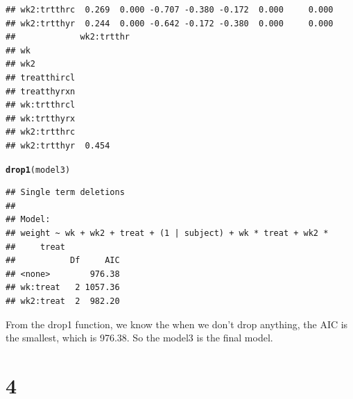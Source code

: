 \documentclass{article}\usepackage[]{graphicx}\usepackage[]{color}
\makeatletter
\newcommand{\hlstd}[1]{\textcolor[rgb]{0.345,0.345,0.345}{#1}}%
\newcommand{\hlkwd}[1]{\textcolor[rgb]{0.737,0.353,0.396}{\textbf{#1}}}%
\newenvironment{kframe}{%
 \def\at@end@of@kframe{}%
 \ifinner\ifhmode%
  \def\at@end@of@kframe{\end{minipage}}%
  \begin{minipage}{\columnwidth}%
 \fi\fi%
 \def\FrameCommand##1{\hskip\@totalleftmargin \hskip-\fboxsep
 \colorbox{shadecolor}{##1}\hskip-\fboxsep
     \hskip-\linewidth \hskip-\@totalleftmargin \hskip\columnwidth}%
 \MakeFramed {\advance\hsize-\width
   \@totalleftmargin\z@ \linewidth\hsize
   \@setminipage}}%
 {\par\unskip\endMakeFramed%
 \at@end@of@kframe}
\newenvironment{knitrout}{}{} %
\makeatother
\begin{document}
\begin{enumerate}[(a)]
\begin{knitrout}
\begin{kframe}
\begin{verbatim}
## wk2:trtthrc  0.269  0.000 -0.707 -0.380 -0.172  0.000     0.000   
## wk2:trtthyr  0.244  0.000 -0.642 -0.172 -0.380  0.000     0.000   
##             wk2:trtthr
## wk                    
## wk2                   
## treatthircl           
## treatthyrxn           
## wk:trtthrcl           
## wk:trtthyrx           
## wk2:trtthrc           
## wk2:trtthyr  0.454
\end{verbatim}
\begin{alltt}
  \hlkwd{drop1}\hlstd{(model3)}
\end{alltt}
\begin{verbatim}
## Single term deletions
## 
## Model:
## weight ~ wk + wk2 + treat + (1 | subject) + wk * treat + wk2 * 
##     treat
##           Df     AIC
## <none>        976.38
## wk:treat   2 1057.36
## wk2:treat  2  982.20
\end{verbatim}
\end{kframe}
\end{knitrout}

\qquad From the drop1 function, we know the when we don't drop anything, the AIC is the smallest, which is 976.38. So the model3 is the final model.

\end{enumerate}

\section{4}
\end{document}
